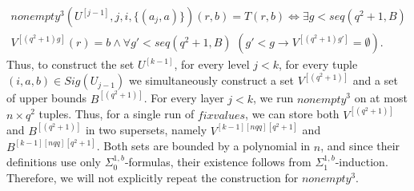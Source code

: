 \documentclass{article}
\theoremstyle{definition}
\theoremstyle{theorem}
\theoremstyle{theorem}
\theoremstyle{remark}
\theoremstyle{remark}
\theoremstyle{example}
\theoremstyle{notation}
\theoremstyle{theorem}
\begin{document}
\begin{equation*}
\begin{gathered}
nonempty^3(U^{[j-1]}, j, i, \{(a_j, a)\})(r, b) = T(r, b) \iff \exists g < seq(q^2 + 1, B) \\
V^{[(q^2 + 1)g]}(r) = b \wedge \forall g' < seq(q^2 + 1, B)\,\, (g' < g \rightarrow V^{[(q^2 + 1)g']} = \emptyset).
\end{gathered}
\end{equation*}
Thus, to construct the set $U^{[k-1]}$, for every level $j < k$, for every tuple $(i,a,b)\in Sig(U_{j-1})$ we simultaneously construct a set $V^{[(q^2 + 1)]}$ and a set of upper bounds $B^{[(q^2 + 1)]}$. 
For every layer $j < k$, we run $nonempty^3$ on at most $n \times q^2$ tuples. Thus, for a single run of $fixvalues$, we can store both $V^{[(q^2 + 1)]}$ and $B^{[(q^2 + 1)]}$ in two supersets, namely $V^{[k-1][nqq][q^2 + 1]}$ and $B^{[k-1][nqq][q^2 + 1]}$. Both sets are bounded by a polynomial in $n$, and since their definitions use only $\Sigma^{1,b}_0$-formulas, their existence follows from $\Sigma^{1,b}_1$-induction. Therefore, we will not explicitly repeat the construction for $nonempty^3$.
\end{document}
